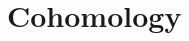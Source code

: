\documentclass[b5paper]{article}
\newcommand{\Chbar}{\mathbb{C}^\times _\hbar}
\begin{document}

\section{Cohomology}
\end{document}

